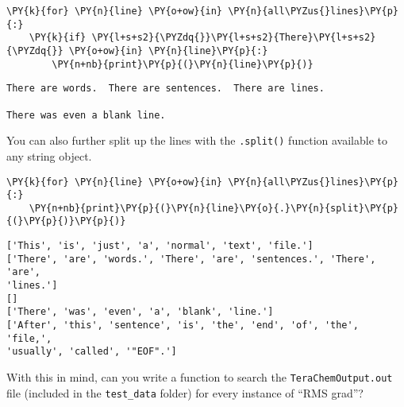     \begin{tcolorbox}[breakable, size=fbox, boxrule=1pt, pad at break*=1mm,colback=cellbackground, colframe=cellborder]
\begin{Verbatim}[commandchars=\\\{\}]
\PY{k}{for} \PY{n}{line} \PY{o+ow}{in} \PY{n}{all\PYZus{}lines}\PY{p}{:}
    \PY{k}{if} \PY{l+s+s2}{\PYZdq{}}\PY{l+s+s2}{There}\PY{l+s+s2}{\PYZdq{}} \PY{o+ow}{in} \PY{n}{line}\PY{p}{:}
        \PY{n+nb}{print}\PY{p}{(}\PY{n}{line}\PY{p}{)}
\end{Verbatim}
\end{tcolorbox}

    \begin{Verbatim}[commandchars=\\\{\}]
There are words.  There are sentences.  There are lines.

There was even a blank line.

    \end{Verbatim}

    You can also further split up the lines with the \texttt{.split()}
function available to any string object.

    \begin{tcolorbox}[breakable, size=fbox, boxrule=1pt, pad at break*=1mm,colback=cellbackground, colframe=cellborder]
\begin{Verbatim}[commandchars=\\\{\}]
\PY{k}{for} \PY{n}{line} \PY{o+ow}{in} \PY{n}{all\PYZus{}lines}\PY{p}{:}
    \PY{n+nb}{print}\PY{p}{(}\PY{n}{line}\PY{o}{.}\PY{n}{split}\PY{p}{(}\PY{p}{)}\PY{p}{)}
\end{Verbatim}
\end{tcolorbox}

    \begin{Verbatim}[commandchars=\\\{\}]
['This', 'is', 'just', 'a', 'normal', 'text', 'file.']
['There', 'are', 'words.', 'There', 'are', 'sentences.', 'There', 'are',
'lines.']
[]
['There', 'was', 'even', 'a', 'blank', 'line.']
['After', 'this', 'sentence', 'is', 'the', 'end', 'of', 'the', 'file,',
'usually', 'called', '"EOF".']
    \end{Verbatim}

    With this in mind, can you write a function to search the
\texttt{TeraChemOutput.out} file (included in the \texttt{test\_data}
folder) for every instance of ``RMS grad''?

